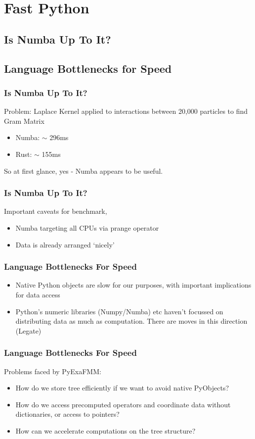 \section{Fast Python}
\subsection{Is Numba Up To It?}
\subsection{Language Bottlenecks for Speed}

\begin{frame}
\frametitle{Is Numba Up To It?}

Problem: Laplace Kernel applied to interactions between 20,000 particles to find Gram Matrix
\begin{itemize}
    \item Numba: $\sim$ 296ms
    \item Rust: $\sim$ 155ms
\end{itemize}

So at first glance, yes - Numba appears to be useful.
\end{frame}

\begin{frame}
\frametitle{Is Numba Up To It?}
    Important caveats for benchmark,
    \begin{itemize}
        \item Numba targeting all CPUs via prange operator
        \item Data is already arranged `nicely'
    \end{itemize}
\end{frame}

\begin{frame}
    \frametitle{Language Bottlenecks For Speed}
    \begin{itemize}
        \item Native Python objects are slow for our purposes, with important implications for data access
        \item Python's numeric libraries (Numpy/Numba) etc haven't focussed on distributing data as much as computation. There are moves in this direction (Legate)
    \end{itemize}
\end{frame}


\begin{frame}
    \frametitle{Language Bottlenecks For Speed}
    Problems faced by PyExaFMM:
    \begin{itemize}
        \item How do we store tree efficiently if we want to avoid native PyObjects?
        \item How do we access precomputed operators and coordinate data without dictionaries, or access to pointers?
        \item How can we accelerate computations on the tree structure?
    \end{itemize}
\end{frame}


